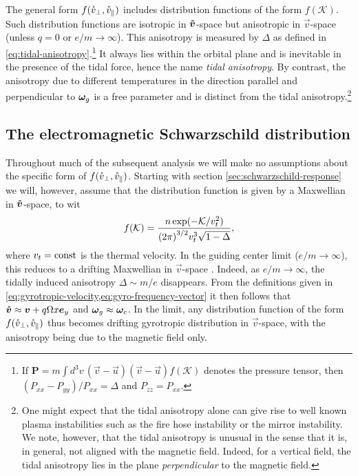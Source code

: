 \documentclass[aps,pre,notitlepage,amsmath,amssymb,amsfonts,nobibnotes,nofootinbib]{revtex4-1}
\begin{document}
The general form $f(\mathring{v}_\perp,\mathring{v}_\parallel)$ includes distribution functions
of the form $f(\mathcal{K})$. Such distribution functions are isotropic in
$\bm{\mathring{v}}$-space but anisotropic in $\vec{v}$-space (unless $q=0$ or
$e/m\to\infty$). This anisotropy is measured by $\Delta$ as defined in
\cref{eq:tidal-anisotropy}.\footnote{If
  $\mathbf{P}=m\int\!d^3v\,(\vec{v}-\vec{u})(\vec{v}-\vec{u})f(\mathcal{K})$
  denotes the pressure tensor, then $(P_{xx}-P_{yy})/P_{xx}=\Delta$ and
  $P_{zz}=P_{xx}$.} It always lies within the orbital plane and is inevitable
in the presence of the tidal force, hence the name \emph{tidal anisotropy}. By
contrast, the anisotropy due to different temperatures in the direction
parallel and perpendicular to $\bm{\omega}_g$ is a free parameter and is distinct from
the tidal anisotropy.\footnote{One might expect that the tidal anisotropy
  alone can give rise to well known plasma instabilities such as the fire hose
  instability or the mirror instability. We note, however, that the tidal
  anisotropy is unusual in the sense that it is, in general, not aligned with
  the magnetic field. Indeed, for a vertical field, the tidal anisotropy lies
  in the plane \emph{perpendicular} to the magnetic field.}

\subsection{The electromagnetic Schwarzschild distribution}

Throughout much of the subsequent analysis we will make no assumptions about
the specific form of $f(\mathring{v}_\perp,\mathring{v}_\parallel)$. Starting with section
\cref{sec:schwarzschild-response} we will, however, assume that the
distribution function is given by a Maxwellian in $\bm{\mathring{v}}$-space, to wit
\begin{equation}
  \label{em:schwarzschild}
  f(\mathcal{K}) =
  \frac{n\exp(-\mathcal{K}/\vt^2)}{{(2\pi)}^{3/2}\vt^3\sqrt{1-\Delta}},
\end{equation}
where $v_t=\mathrm{const}$ is the thermal velocity. In the guiding center
limit ($e/m\to\infty$), this reduces to a drifting Maxwellian in
$\vec{v}$-space \citep[as used in e.g.][]{Quataert2002}. Indeed, as
$e/m\to\infty$, the tidally induced anisotropy $\Delta\sim{}m/e$ disappears.
From the definitions given in
\cref{eq:gyrotropic-velocity,eq:gyro-frequency-vector} it then follows that
$\bm{\mathring{v}}\approx\bm{v}+q\Omega{}x\bm{e}_y$ and $\bm{\omega}_g\approx\bm{\omega}_c$. In the limit, any
distribution function of the form $f(\mathring{v}_\perp,\mathring{v}_\parallel)$ thus becomes
drifting gyrotropic distribution in $\vec{v}$-space, with the anisotropy being
due to the magnetic field only.
\end{document}
